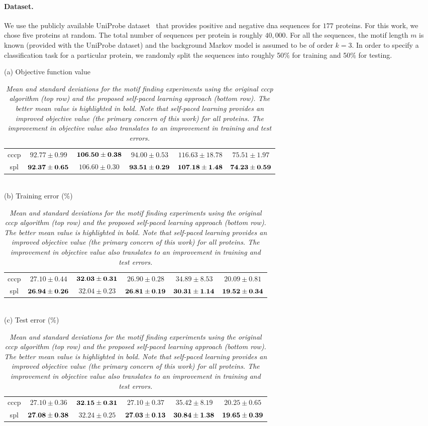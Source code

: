 \documentclass{article}
\newcommand{\myparagraph}[1]{\vspace{-2mm}\paragraph{#1}}
\newcommand{\mycaption}[1]{\vspace{-3mm}\caption{\em \footnotesize #1}\vspace{-3mm}}
\begin{document}
\myparagraph{Dataset.} We use the publicly available UniProbe dataset~\cite{bergercell08} that provides positive
and negative {\sc dna} sequences for $177$ proteins. For this work, we chose five proteins at random. The total
number of sequences per protein is roughly $40,000$.
For all the sequences, the motif length $m$ is known (provided with the UniProbe dataset)
and the background Markov model is assumed to be of order $k=3$.
In order to specify a classification task for a particular protein, we randomly split the sequences into roughly 50\% 
for training and 50\% for testing.
\begin{table}[h!]
\small
\begin{center}
(a) Objective function value \\
\begin{tabular}{|c|c|c|c|c|c|}
\hline
{\sc cccp} & $92.77 \pm 0.99$ & ${\bf 106.50 \pm 0.38}$ & $94.00 \pm 0.53$ & $116.63 \pm 18.78$ & $75.51 \pm 1.97$ \\ 
{\sc spl} & ${\bf 92.37 \pm 0.65}$ & $106.60 \pm 0.30$ & ${\bf 93.51 \pm 0.29}$ & ${\bf 107.18 \pm 1.48}$ & ${\bf 74.23 \pm 0.59}$ \\
\hline
\end{tabular} 
\vspace{1mm}
\\(b) Training error (\%) \\
\begin{tabular}{|c|c|c|c|c|c|}
\hline
{\sc cccp} & $27.10 \pm 0.44$ & ${\bf 32.03 \pm 0.31}$ & $26.90 \pm 0.28$ & $34.89 \pm 8.53$ & $20.09 \pm 0.81$ \\
{\sc spl} & ${\bf 26.94 \pm 0.26}$ & $32.04 \pm 0.23$ & ${\bf 26.81 \pm 0.19}$ & ${\bf 30.31 \pm 1.14}$ & ${\bf 19.52 \pm 0.34}$ \\
\hline
\end{tabular}
\vspace{1mm}
\\(c) Test error (\%) \\
\begin{tabular}{|c|c|c|c|c|c|}
\hline
{\sc cccp} & $27.10 \pm 0.36$ & ${\bf 32.15 \pm 0.31}$ & $27.10 \pm 0.37$ & $35.42 \pm 8.19$ & $20.25 \pm 0.65$ \\
{\sc spl} & ${\bf 27.08 \pm 0.38}$ & $32.24 \pm 0.25$ & ${\bf 27.03 \pm 0.13}$ & ${\bf 30.84 \pm 1.38}$ & ${\bf 19.65 \pm 0.39}$ \\
\hline
\end{tabular}
\end{center}
\mycaption{\it Mean and standard deviations for the motif finding experiments using the original {\sc cccp} algorithm (top row) and the proposed
self-paced learning approach (bottom row). The better mean value is highlighted in bold. Note that self-paced learning
provides an improved objective value (the primary concern of this work)
for all proteins. The
improvement in objective value also translates to an improvement in training and test errors.}
\label{table:motif}
\end{table}
\end{document}
